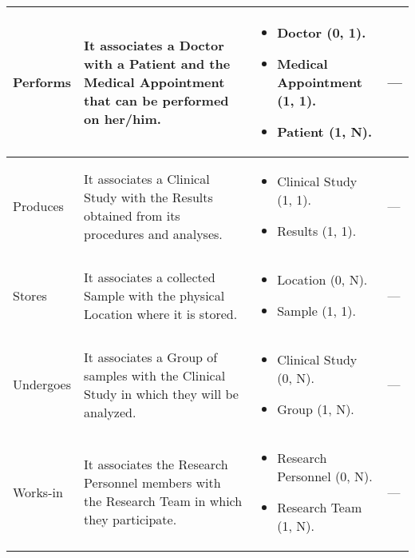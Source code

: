 \begin{longtable}{|p{}|p{} |p{}|p{} |}
 Performs & It associates a Doctor with a Patient and the Medical Appointment that can be performed on her/him. & \begin{itemize}
        \vspace{-1em}
        \item Doctor (0, 1).
        \item Medical Appointment (1, 1).
        \item Patient (1, N).
    \end{itemize}
 &  --- \\\hline

 Produces & It associates a Clinical Study with the Results obtained from its procedures and analyses. & \begin{itemize}
        \vspace{-1em}
        \item Clinical Study (1, 1).
        \item Results (1, 1).
    \end{itemize}
 &  --- \\\hline

 Stores & It associates a collected Sample with the physical Location where it is stored. & \begin{itemize}
        \vspace{-1em}
        \item Location (0, N).
        \item Sample (1, 1).
    \end{itemize}
 &  --- \\\hline

 Undergoes & It associates a Group of samples with the Clinical Study in which they will be analyzed. & \begin{itemize}
        \vspace{-1em}
        \item Clinical Study (0, N).
        \item Group (1, N).
    \end{itemize}
 &  --- \\\hline

 Works-in & It associates the Research Personnel members with the Research Team in which they participate. & \begin{itemize}
        \vspace{-1em}
        \item Research Personnel (0, N).
        \item Research Team (1, N).
    \end{itemize}
 &  --- \\\hline

\end{longtable}
